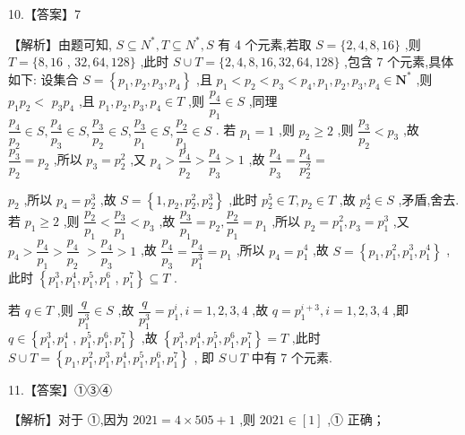 \documentclass[10pt]{article}
\begin{document}
10.【答案】7

【解析】由题可知, $S \subseteq  {{N}}^{ * },T \subseteq  {{N}}^{ * },S$ 有 4 个元素,若取 $S = \{ 2,4,8,{16}\}$ ,则 $T = \{ 8,{16}$ , ${32},{64},{128}\}$ ,此时 $S \cup  T = \{ 2,4,8,{16},{32},{64},{128}\}$ ,包含 7 个元素,具体如下: 设集合 $S = \left\{  {{p}_{1},{p}_{2},{p}_{3},{p}_{4}}\right\}$ ,且 ${p}_{1} < {p}_{2} < {p}_{3} < {p}_{4},{p}_{1},{p}_{2},{p}_{3},{p}_{4} \in  {\mathbf{N}}^{ * }$ ,则 ${p}_{1}{p}_{2} <$  ${p}_{3}{p}_{4}$ ,且 ${p}_{1},{p}_{2},{p}_{3},{p}_{4} \in  T$ ,则 $\dfrac{{p}_{4}}{{p}_{1}} \in  S$ ,同理 $\dfrac{{p}_{4}}{{p}_{2}} \in  S,\dfrac{{p}_{4}}{{p}_{3}} \in  S,\dfrac{{p}_{3}}{{p}_{2}} \in  S,\dfrac{{p}_{3}}{{p}_{1}} \in  S,\dfrac{{p}_{2}}{{p}_{1}} \in  S$ . 若 ${p}_{1} = 1$ ,则 ${p}_{2} \geq  2$ ,则 $\dfrac{{p}_{3}}{{p}_{2}} < {p}_{3}$ ,故 $\dfrac{{p}_{3}}{{p}_{2}} = {p}_{2}$ ,所以 ${p}_{3} = {p}_{2}^{2}$ ,又 ${p}_{4} > \dfrac{{p}_{4}}{{p}_{2}} > \dfrac{{p}_{4}}{{p}_{3}} > 1$ ,故 $\dfrac{{p}_{4}}{{p}_{3}} = \dfrac{{p}_{4}}{{p}_{2}^{2}} =$

${p}_{2}$ ,所以 ${p}_{4} = {p}_{2}^{3}$ ,故 $S = \left\{  {1,{p}_{2},{p}_{2}^{2},{p}_{2}^{3}}\right\}$ ,此时 ${p}_{2}^{5} \in  T,{p}_{2} \in  T$ ,故 ${p}_{2}^{4} \in  S$ ,矛盾,舍去. 若 ${p}_{1} \geq  2$ ,则 $\dfrac{{p}_{2}}{{p}_{1}} < \dfrac{{p}_{3}}{{p}_{1}} < {p}_{3}$ ,故 $\dfrac{{p}_{3}}{{p}_{1}} = {p}_{2},\dfrac{{p}_{2}}{{p}_{1}} = {p}_{1}$ ,所以 ${p}_{2} = {p}_{1}^{2},{p}_{3} = {p}_{1}^{3}$ ,又 ${p}_{4} > \dfrac{{p}_{4}}{{p}_{1}} > \dfrac{{p}_{4}}{{p}_{2}}$  $> \dfrac{{p}_{4}}{{p}_{3}} > 1$ ,故 $\dfrac{{p}_{4}}{{p}_{3}} = \dfrac{{p}_{4}}{{p}_{1}^{3}} = {p}_{1}$ ,所以 ${p}_{4} = {p}_{1}^{4}$ ,故 $S = \left\{  {{p}_{1},{p}_{1}^{2},{p}_{1}^{3},{p}_{1}^{4}}\right\}$ ,此时 $\left\{  {{p}_{1}^{3},{p}_{1}^{4},{p}_{1}^{5},{p}_{1}^{6}}\right.$ , $\left. {p}_{1}^{7}\right\}   \subseteq  T$ .

若 $q \in  T$ ,则 $\dfrac{q}{{p}_{1}^{3}} \in  S$ ,故 $\dfrac{q}{{p}_{1}^{3}} = {p}_{1}^{i},i = 1,2,3,4$ ,故 $q = {p}_{1}^{i + 3},i = 1,2,3,4$ ,即 $q \in  \left\{  {{p}_{1}^{3},{p}_{1}^{4}}\right.$ , $\left. {{p}_{1}^{5},{p}_{1}^{6},{p}_{1}^{7}}\right\}$ ,故 $\left\{  {{p}_{1}^{3},{p}_{1}^{4},{p}_{1}^{5},{p}_{1}^{6},{p}_{1}^{7}}\right\}   = T$ ,此时 $S \cup  T = \left\{  {{p}_{1},{p}_{1}^{2},{p}_{1}^{3},{p}_{1}^{4},{p}_{1}^{5},{p}_{1}^{6},{p}_{1}^{7}}\right\}$ , 即 $S \cup  T$ 中有 7 个元素.

11.【答案】①③④

【解析】对于 ①,因为 ${2021} = 4 \times  {505} + 1$ ,则 ${2021} \in  \left\lbrack  1\right\rbrack$ ,① 正确；
\end{document}
